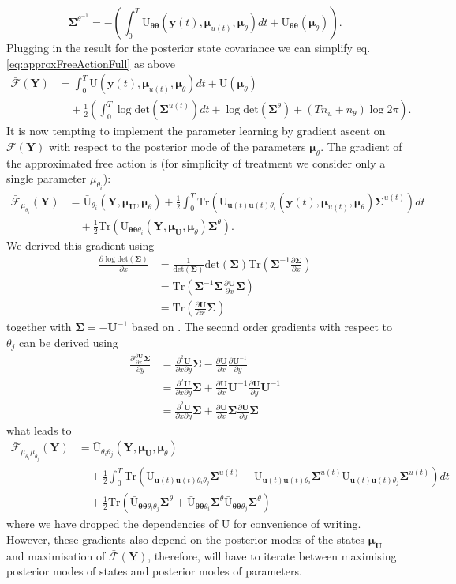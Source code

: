 \documentclass[a4paper,10pt]{article}
\newcommand{\bs}[1]{\mathbf{#1}}					%
\newcommand{\bgs}[1]{\boldsymbol{#1}}				%
\newcommand{\pd}[2]{\frac{\partial #1}{\partial #2}} 	%
\newcommand{\ppd}[3]{\frac{\partial^2 #1}{\partial #2 \partial #3}} %
\newcommand{\eq}[1]{\begin{equation} #1 \end{equation}}%
\newcommand{\trace}[1]{\mathrm{Tr}\left(#1\right)}					%
\renewcommand{\ss}{u}         %
\newcommand{\so}{y}         %
\renewcommand{\sp}{\theta}    %
\newcommand{\ps}{\bs{\ss}}    %
\newcommand{\po}{\bs{\so}}    %
\newcommand{\pp}{\bgs{\sp}} %
\newcommand{\Ps}{\bs{U}}    %
\newcommand{\Po}{\bs{Y}}    %
\newcommand{\U}{\mathrm{U}}			%
\newcommand{\Ua}{\bar{\mathrm{U}}}		%
\newcommand{\Fa}{\bar{\mathcal{F}}}		%
\newcommand{\Cov}{\bgs{\Sigma}}			%
\renewcommand{\det}[1]{\mathrm{det}(#1)}	%
\begin{document}
\eq{\label{eq:postCovParam}
    \Cov^{\sp^{-1}} = -\left(\int_0^T \U_{\pp\pp}(\po(t),\bgs{\mu}_{\ss(t)},\bgs{\mu}_\sp)dt + \U_{\pp\pp}(\bgs{\mu}_\sp)\right).
}
Plugging in the result for the posterior state covariance we can simplify eq. \eqref{eq:approxFreeActionFull} as above
\begin{align}
    \Fa(\Po) &= \label{eq:approxFreeAction} \int_0^T  \U(\po(t),\bgs{\mu}_{\ss(t)},\bgs{\mu}_\sp)dt +  \U(\bgs{\mu}_\sp) \nonumber\\
    &\quad + \frac{1}{2} \left(\int_0^T \log \det{\Cov^{\ss(t)}} dt + \log \det{\Cov^\sp} + (Tn_\ss + n_{\sp}) \log 2\pi\right).
\end{align}
It is now tempting to implement the parameter learning by gradient ascent on $\Fa(\Po)$ with respect to the posterior mode of the parameters $\bgs{\mu}_\sp$. The gradient of the approximated free action is (for simplicity of treatment we consider only a single parameter $\mu_{\sp_i}$):
\begin{align}
    \Fa_{\mu_{\sp_i}}(\Po) &= \Ua_{\sp_i}(\Po,\bgs{\mu}_\Ps,\bgs{\mu}_\sp) + \frac{1}{2}\int_0^T \trace{\U_{\ps(t)\ps(t)\sp_i}(\po(t),\bgs{\mu}_{\ss(t)},\bgs{\mu}_\sp)\Cov^{\ss(t)}}dt\nonumber\\
    &\quad \label{eq:approxFreeActionDp} + \frac{1}{2}\trace{\Ua_{\pp\pp\sp_i}(\Po,\bgs{\mu}_\Ps,\bgs{\mu}_\sp)\Cov^\sp}.
\end{align}
We derived this gradient using 
\begin{align}
    \pd{\log \det{\Cov}}{x} &= \frac{1}{\det{\Cov}}\det{\Cov}\trace{\Cov^{-1}\pd{\Cov}{x}}\\
    &= \trace{\Cov^{-1}\Cov\pd{\bs{U}}{x}\Cov}\\
    &= \trace{\pd{\bs{U}}{x}\Cov}
\end{align}
together with $\Cov = -\bs{U}^{-1}$ based on \citep[][eqs. (41) and (53)]{Petersen2008}. The second order gradients with respect to $\sp_j$ can be derived using
\begin{align}
    \pd{\pd{\bs{U}}{x}\Cov}{y} &= \ppd{\bs{U}}{x}{y}\Cov - \pd{\bs{U}}{x}\pd{\bs{U}^{-1}}{y}\\
    &= \ppd{\bs{U}}{x}{y}\Cov + \pd{\bs{U}}{x}\bs{U}^{-1}\pd{\bs{U}}{y}\bs{U}^{-1}\\
    &= \ppd{\bs{U}}{x}{y}\Cov + \pd{\bs{U}}{x}\Cov\pd{\bs{U}}{y}\Cov
\end{align}
what leads to
\begin{align}
    \Fa_{\mu_{\sp_i}\mu_{\sp_j}}(\Po) &= \Ua_{\sp_i\sp_j}(\Po,\bgs{\mu}_\Ps,\bgs{\mu}_\sp) \nonumber\\
    &\quad + \frac{1}{2}\int_0^T \trace{\U_{\ps(t)\ps(t)\sp_i\sp_j}\Cov^{\ss(t)} - \U_{\ps(t)\ps(t)\sp_i}\Cov^{\ss(t)}\U_{\ps(t)\ps(t)\sp_j}\Cov^{\ss(t)}} dt\nonumber\\
    &\quad \label{eq:approxFreeActionDpDp} + \frac{1}{2}\trace{\Ua_{\pp\pp\sp_i\sp_j}\Cov^\sp + \Ua_{\pp\pp\sp_i}\Cov^\sp\Ua_{\pp\pp\sp_j}\Cov^\sp}
\end{align}
where we have dropped the dependencies of $\U$ for convenience of writing. However, these gradients also depend on the posterior modes of the states $\bgs{\mu}_\Ps$ and maximisation of $\Fa(\Po)$, therefore, will have to iterate between maximising posterior modes of states and posterior modes of parameters.
\end{document}
